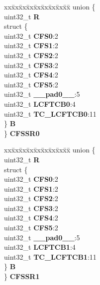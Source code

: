 \begin{DoxyCompactItemize}
\begin{tabbing}
\end{tabbing}\item 
\mbox{\label{structEQADC__tag_a2cb71be58210f47c16769e93a2c8fc81}} 
\begin{tabbing}
xx\=xx\=xx\=xx\=xx\=xx\=xx\=xx\=xx\=\kill
union \{\\
\>uint32\_t {\bfseries R}\\
\>struct \{\\
\>\>uint32\_t {\bfseries CFS0}:2\\
\>\>uint32\_t {\bfseries CFS1}:2\\
\>\>uint32\_t {\bfseries CFS2}:2\\
\>\>uint32\_t {\bfseries CFS3}:2\\
\>\>uint32\_t {\bfseries CFS4}:2\\
\>\>uint32\_t {\bfseries CFS5}:2\\
\>\>uint32\_t {\bfseries \_\_pad0\_\_}:5\\
\>\>uint32\_t {\bfseries LCFTCB0}:4\\
\>\>uint32\_t {\bfseries TC\_LCFTCB0}:11\\
\>\} {\bfseries B}\\
\} {\bfseries CFSSR0}\\

\end{tabbing}\item 
\mbox{\label{structEQADC__tag_a496755807b3d9e65259a21ec765a0ced}} 
\begin{tabbing}
xx\=xx\=xx\=xx\=xx\=xx\=xx\=xx\=xx\=\kill
union \{\\
\>uint32\_t {\bfseries R}\\
\>struct \{\\
\>\>uint32\_t {\bfseries CFS0}:2\\
\>\>uint32\_t {\bfseries CFS1}:2\\
\>\>uint32\_t {\bfseries CFS2}:2\\
\>\>uint32\_t {\bfseries CFS3}:2\\
\>\>uint32\_t {\bfseries CFS4}:2\\
\>\>uint32\_t {\bfseries CFS5}:2\\
\>\>uint32\_t {\bfseries \_\_pad0\_\_}:5\\
\>\>uint32\_t {\bfseries LCFTCB1}:4\\
\>\>uint32\_t {\bfseries TC\_LCFTCB1}:11\\
\>\} {\bfseries B}\\
\} {\bfseries CFSSR1}\\


\end{tabbing}
\end{DoxyCompactItemize}
